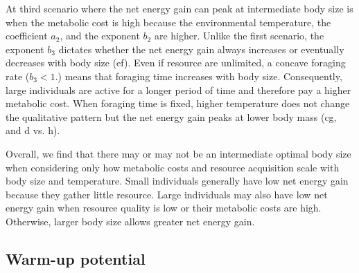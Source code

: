 At third scenario where the net energy gain can peak at intermediate body size is when the metabolic cost is high because the environmental temperature, the coefficient $a_2$, and the exponent $b_2$ are higher.
Unlike the first scenario, the exponent $b_3$ dictates whether the net energy gain always increases or eventually decreases with body size (ef).
Even if resource are unlimited, a concave foraging rate ($b_3 < 1.$) means that foraging time increases with body size.
Consequently, large individuals are active for a longer period of time and therefore pay a  higher metabolic cost.
When foraging time is fixed, higher temperature does not change the qualitative pattern but the net energy gain peaks at lower body mass (cg, and d vs. h).

Overall, we find that there may or may not be an intermediate optimal body size when considering only how metabolic costs and resource acquisition scale with body size and temperature.
Small individuals generally have low net energy gain because they gather little resource.
Large individuals may also have low net energy gain when resource quality is low or their metabolic costs are high.
Otherwise, larger body size allows greater net energy gain.


\subsection*{Warm-up potential}

